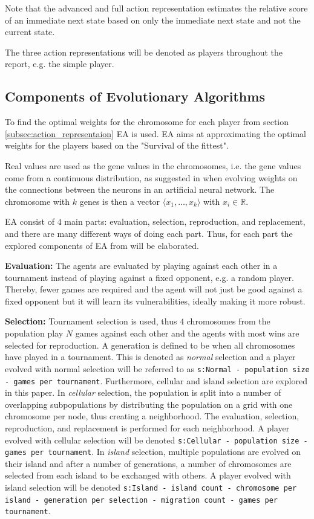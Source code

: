 \documentclass{llncs}
\begin{document}
Note that the advanced and full action representation estimates the relative score of an immediate next state based on only the immediate next state and not the current state.

The three action representations will be denoted as players throughout the report, e.g. the simple player.

\subsection{Components of Evolutionary Algorithms} \label{subsec:ea}
To find the optimal weights for the chromosome for each player from section \ref{subsec:action_representaion} EA is used. EA aims at approximating the optimal weights for the players based on the "Survival of the fittest".

Real values are used as the gene values in the chromosomes, i.e. the gene values come from a continuous distribution, as suggested in \cite{ec:springer} when evolving weights on the connections between the neurons in an artificial neural network. The chromosome with $k$ genes is then a vector $\langle x_1, \dots, x_k \rangle$ with $x_i \in \mathbb{R}$.

EA consist of $4$ main parts: evaluation, selection, reproduction, and replacement, and there are many different ways of doing each part. Thus, for each part the explored components of EA from \cite{ec:springer} will be elaborated.

\textbf{Evaluation:} The agents are evaluated by playing against each other in a tournament instead of playing against a fixed opponent, e.g. a random player. Thereby, fewer games are required and the agent will not just be good against a fixed opponent but it will learn its vulnerabilities, ideally making it more robust.

\textbf{Selection:} Tournament selection is used, thus $4$ chromosomes from the population play $N$ games against each other and the agents with most wins are selected for reproduction. A generation is defined to be when all chromosomes have played in a tournament. This is denoted as \textit{normal} selection and a player evolved with normal selection will be referred to as \texttt{s:Normal - population size - games per tournament}. Furthermore, cellular and island selection are explored in this paper. In \textit{cellular} selection, the population is split into a number of overlapping subpopulations by distributing the population on a grid with one chromosome per node, thus creating a neighborhood. The evaluation, selection, reproduction, and replacement is performed for each neighborhood. A player evolved with cellular selection will be denoted \texttt{s:Cellular - population size - games per tournament}. In \textit{island} selection, multiple populations are evolved on their island and after a number of generations, a number of chromosomes are selected from each island to be exchanged with others. A player evolved with island selection will be denoted \texttt{s:Island - island count - chromosome per island - generation per selection - migration count - games per tournament}.
\end{document}
